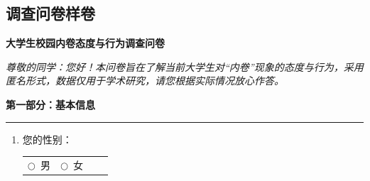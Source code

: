 \documentclass[win,thesis]{hustreport} %
\begin{document}
\begin{appendixblock}
		\section{调查问卷样卷}
		
		\begin{center}
			\Large\bfseries{大学生校园内卷态度与行为调查问卷}
		\end{center}
		
		\vspace{0.5em}
		\noindent\textit{尊敬的同学：您好！本问卷旨在了解当前大学生对“内卷”现象的态度与行为，采用匿名形式，数据仅用于学术研究，请您根据实际情况放心作答。}
		\vspace{1em}
		
		\newcommand{\radio}{$\bigcirc$} %
		\newcommand{\checkb}{$\square$} %
		
		\noindent\textbf{\large 第一部分：基本信息}
		\hrule \vspace{0.5em}
		
		\begin{enumerate}[label=\textbf{Q\arabic*.}, leftmargin=3em, itemsep=0.8em]
			\item 您的性别：\\
			\begin{tabular}{llll}
				\radio\ 男 & \radio\ 女 & & 
			\end{tabular}
			

\end{enumerate}
\end{appendixblock}
\end{document}
